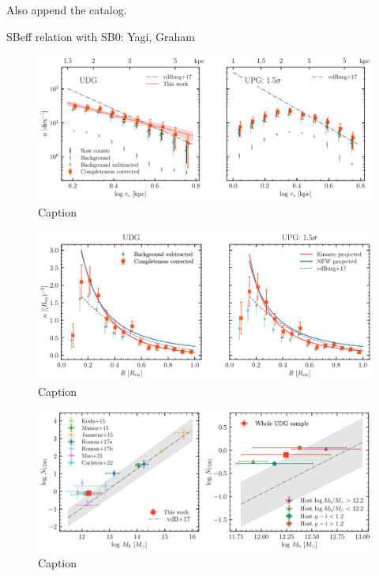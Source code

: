 \documentclass[twocolumn,astrosymb,twocolappendix]{aastex631}
\begin{document}
\begin{CJK*}{UTF8}{gbsn}
Also append the catalog.

SBeff relation with SB0: Yagi, Graham




\begin{figure}
	\vbox{ 
		\centering
		\includegraphics[width=1\linewidth]{size_distribution.pdf}
	}
    \caption{Caption}
    \label{fig:size_distribution}
\end{figure}


\begin{figure}
	\vbox{ 
		\centering
		\includegraphics[width=1\linewidth]{radial_distribution.pdf}
	}
    \caption{Caption}
    \label{fig:radial_distribution}
\end{figure}


\begin{figure}
	\vbox{ 
		\centering
		\includegraphics[width=1\linewidth]{N_UDG_host_mass.pdf}
	}
    \caption{Caption}
    \label{fig:n_udg}
\end{figure}


\end{CJK*}
\end{document}

